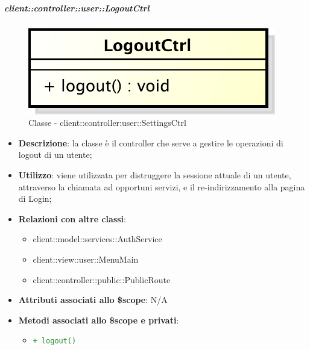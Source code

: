 		\subparagraph{client::controller::user::LogoutCtrl} %
		\label{subp:bdsm_app_client_controller_user_logoutctrl}
			\begin{figure}[htbp]
				\centering
				\centerline{\includegraphics[scale=0.7]{./images/client/classes/controller/logout_ctrl.pdf}}
				\caption{Classe - client::controller:user::SettingsCtrl}
			\end{figure}
			\begin{itemize}
				\item \textbf{Descrizione}: la classe è il controller che serve a gestire le operazioni di logout di un utente;
				\item \textbf{Utilizzo}: viene utilizzata per distruggere la sessione attuale di un utente, attraverso la chiamata ad opportuni servizi, e il re-indirizzamento alla pagina di Login;
				\item \textbf{Relazioni con altre classi}:
					\begin{itemize}
						\item client::model::services::AuthService
						\item client::view::user::MenuMain
						\item client::controller::public::PublicRoute
					\end{itemize}
				\item \textbf{Attributi associati allo \$scope}: N/A
				\item \textbf{Metodi associati allo \$scope e privati}:
					\begin{itemize}
						\item \textcolor{forestgreen}{\texttt{+ logout()}}
					\end{itemize}
			\end{itemize}

